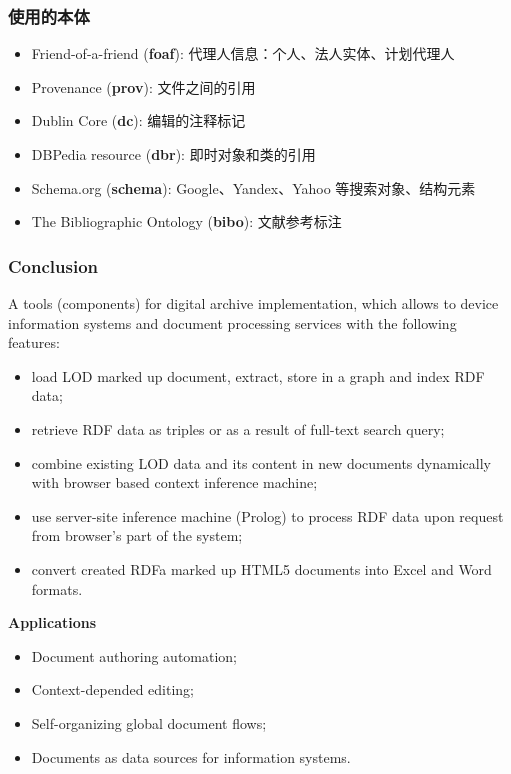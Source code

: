 \documentclass[10pt]{beamer}
\begin{document}
\begin{frame}
  \frametitle{使用的本体}
  \begin{itemize}
  \item Friend-of-a-friend (\textbf{foaf}): 代理人信息：个人、法人实体、计划代理人
  \item Provenance (\textbf{prov}): 文件之间的引用
  \item Dublin Core (\textbf{dc}): 编辑的注释标记
  \item DBPedia resource (\textbf{dbr}): 即时对象和类的引用
  \item Schema.org (\textbf{schema}): Google、Yandex、Yahoo 等搜索对象、结构元素
  \item The Bibliographic Ontology (\textbf{bibo}): 文献参考标注
\end{itemize}
\end{frame}



\begin{frame}
\frametitle{Conclusion}
A tools (components) for digital archive implementation, which allows
to device information systems and document processing services
with the following features:
\begin{itemize}
\item load LOD marked up document, extract, store in a graph and index RDF data;
\item retrieve RDF data as triples or as a result of full-text search query;
\item combine existing LOD data and its content in new documents dynamically with browser based context inference machine;
\item use server-site inference machine (Prolog) to process RDF data upon
  request from browser's part of the system;
\item convert created RDFa marked up HTML5 documents into Excel and Word formats.
 \end{itemize}

   \textbf{Applications}
   \begin{itemize}
 \item Document authoring automation;
 \item Context-depended editing;
 \item Self-organizing global document flows;
 \item Documents as data sources for information systems.

   \end{itemize}
 \end{frame}
\end{document}
